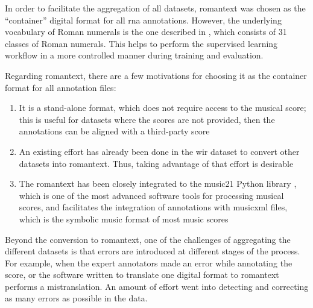 
In order to facilitate the aggregation of all datasets,
\gls{romantext} was chosen as the ``container'' digital
format for all \gls{rna} annotations. However, the
underlying vocabulary of Roman numerals is the one described
in , which consists of
31 classes of Roman numerals. This helps to perform the
supervised learning workflow in a more controlled manner
during training and evaluation.

Regarding \gls{romantext}, there are a few motivations for
choosing it as the container format for all annotation
files:

\begin{enumerate} 
    \item It is a stand-alone format, which does not require
    access to the musical score; this is useful for datasets
    where the scores are not provided, then the annotations
    can be aligned with a third-party score
    \item An existing effort has already been done in the
    \gls{wir} dataset
    \parencite{gotham2019romantext, gotham2022openscore}
    to convert other datasets into \gls{romantext}. Thus,
    taking advantage of that effort is desirable 
    \item The \gls{romantext} has been closely integrated to
    the music21 Python library
    \parencite{cuthbert2010music21}, which is one of the
    most advanced software tools for processing musical
    scores, and facilitates the integration of annotations
    with \gls{musicxml} files, which is the symbolic music
    format of most music scores 
\end{enumerate}

Beyond the conversion to \gls{romantext}, one of the
challenges of aggregating the different datasets is that
errors are introduced at different stages of the process.
For example, when the expert annotators made an error while
annotating the score, or the software written to translate
one digital format to \gls{romantext} performs a
mistranslation. An amount of effort went into detecting and
correcting as many errors as possible in the data.


